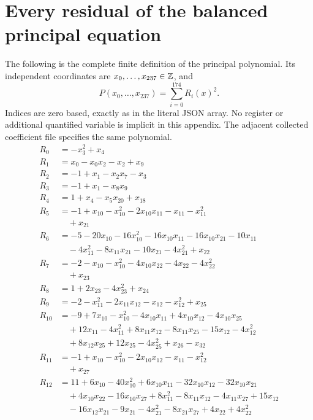 \appendix
\section{Every residual of the balanced principal equation}
\label{sec:residuals}
The following is the complete finite definition of the principal polynomial.
Its independent coordinates are $x_0,\ldots,x_{237}\in\mathbb Z$, and
\[P(x_0,\ldots,x_{237})=\sum_{i=0}^{174}R_i(x)^2.\]
Indices are zero based, exactly as in the literal JSON array. No register
or additional quantified variable is implicit in this appendix. The
adjacent collected coefficient file specifies the same polynomial.
\begingroup\small\setlength{\jot}{1pt}\allowdisplaybreaks[4]
\begin{align*}
R_{0}&=-x_{3}^{2}+x_{4}\\
R_{1}&=x_{0}-x_{0}x_{2}-x_{2}+x_{9}\\
R_{2}&=-1+x_{1}-x_{2}x_{7}-x_{3}\\
R_{3}&=-1+x_{1}-x_{8}x_{9}\\
R_{4}&=1+x_{4}-x_{5}x_{20}+x_{18}\\
R_{5}&=-1+x_{10}-x_{10}^{2}-2x_{10}x_{11}-x_{11}-x_{11}^{2}\\
&\quad{}+x_{21}\\
R_{6}&=-5-20x_{10}-16x_{10}^{2}-16x_{10}x_{11}-16x_{10}x_{21}-10x_{11}\\
&\quad{}-4x_{11}^{2}-8x_{11}x_{21}-10x_{21}-4x_{21}^{2}+x_{22}\\
R_{7}&=-2-x_{10}-x_{10}^{2}-4x_{10}x_{22}-4x_{22}-4x_{22}^{2}\\
&\quad{}+x_{23}\\
R_{8}&=1+2x_{23}-4x_{23}^{2}+x_{24}\\
R_{9}&=-2-x_{11}^{2}-2x_{11}x_{12}-x_{12}-x_{12}^{2}+x_{25}\\
R_{10}&=-9+7x_{10}-x_{10}^{2}-4x_{10}x_{11}+4x_{10}x_{12}-4x_{10}x_{25}\\
&\quad{}+12x_{11}-4x_{11}^{2}+8x_{11}x_{12}-8x_{11}x_{25}-15x_{12}-4x_{12}^{2}\\
&\quad{}+8x_{12}x_{25}+12x_{25}-4x_{25}^{2}+x_{26}-x_{32}\\
R_{11}&=-1+x_{10}-x_{10}^{2}-2x_{10}x_{12}-x_{11}-x_{12}^{2}\\
&\quad{}+x_{27}\\
R_{12}&=11+6x_{10}-40x_{10}^{2}+6x_{10}x_{11}-32x_{10}x_{12}-32x_{10}x_{21}\\
&\quad{}+4x_{10}x_{22}-16x_{10}x_{27}+8x_{11}^{2}-8x_{11}x_{12}-4x_{11}x_{27}+15x_{12}\\
&\quad{}-16x_{12}x_{21}-9x_{21}-4x_{21}^{2}-8x_{21}x_{27}+4x_{22}+4x_{22}^{2}\\

\end{align*}
